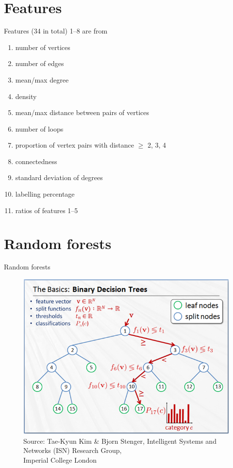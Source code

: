 \documentclass{beamer}
\begin{document}
\section{Features}
\begin{frame}{Features (34 in total)}
  1--8 are from \cite{DBLP:conf/lion/KotthoffMS16}
  \begin{enumerate}
  \item number of vertices
  \item number of edges
  \item mean/max degree
  \item density
  \item mean/max distance between pairs of vertices
  \item number of loops
  \item proportion of vertex pairs with distance $\ge$ 2, 3, 4
  \item connectedness
    \pause
  \item standard deviation of degrees
  \item labelling percentage
    \pause
  \item ratios of features 1--5
  \end{enumerate}
\end{frame}

\section{Random forests}

\begin{frame}{Random forests \parencite{DBLP:journals/ml/Breiman01}}
  \begin{figure}
    \centering
    \includegraphics[scale=0.5]{random_forests_2.png} \\
    {\tiny\color{gray}Source: Tae-Kyun Kim \& Bjorn Stenger, Intelligent Systems and Networks (ISN) Research Group,\\[-7pt] Imperial College London}
  \end{figure}
\end{frame}
\end{document}
